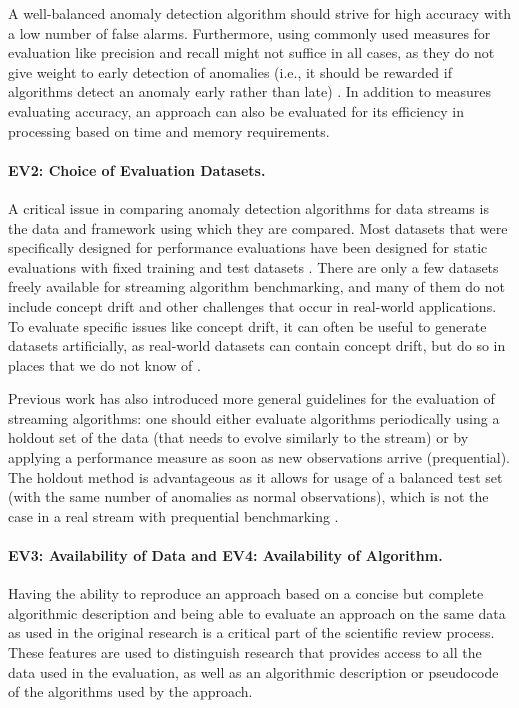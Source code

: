 A well-balanced anomaly detection algorithm should strive for high accuracy with a low number of false alarms. Furthermore, using commonly used measures for evaluation like precision and recall might not suffice in all cases, as they do not give weight to early detection of anomalies (i.e., it should be rewarded if algorithms detect an anomaly early rather than late) \citep{lavin_evaluating_2015}. In addition to measures evaluating accuracy, an approach can also be evaluated for its efficiency in processing based on time and memory requirements. 

\paragraph{EV2: Choice of Evaluation Datasets.}
A critical issue in comparing anomaly detection algorithms for data streams is the data and framework using which they are compared. Most datasets that were specifically designed for performance evaluations have been designed for static evaluations with fixed training and test datasets \citep{ahmad_unsupervised_2017, lavin_evaluating_2015}. There are only a few datasets freely available for streaming algorithm benchmarking, and many of them do not include concept drift and other challenges that occur in real-world applications. To evaluate specific issues like concept drift, it can often be useful to generate datasets artificially, as real-world datasets can contain concept drift, but do so in places that we do not know of \citep{bifet_new_2009}. 

Previous work has also introduced more general guidelines for the evaluation of streaming algorithms: one should either evaluate algorithms periodically using a holdout set of the data (that needs to evolve similarly to the stream) or by applying a performance measure as soon as new observations arrive (prequential). The holdout method is advantageous as it allows for usage of a balanced test set (with the same number of anomalies as normal observations), which is not the case in a real stream with prequential benchmarking \citep{schneider_expected_2016}.

\paragraph{EV3: Availability of Data and EV4: Availability of Algorithm.}
Having the ability to reproduce an approach based on a concise but complete algorithmic description and being able to evaluate an approach on the same data as used in the original research is a critical part of the scientific review process. These features are used to distinguish research that provides access to all the data used in the evaluation, as well as an algorithmic description or pseudocode of the algorithms used by the approach.